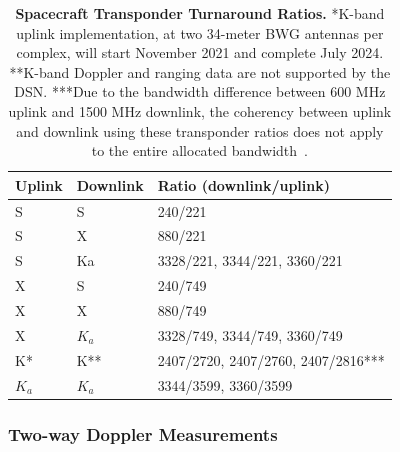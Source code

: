 \begin{table}[htp!]
\renewcommand{\arraystretch}{1.5}
\centering
\caption{
    \textbf{Spacecraft Transponder Turnaround Ratios.} *K-band uplink
    implementation, at two 34-meter BWG antennas per complex, will start
    November 2021 and complete July 2024. **K-band Doppler and ranging data are
    not supported by the DSN. ***Due to the bandwidth difference between 600 MHz
    uplink and 1500 MHz downlink, the coherency between uplink and downlink
    using these transponder ratios does not apply to the entire allocated
    bandwidth~\cite{Berner2020}.
}
\label{tab:turnaround-ratios}
\begin{tabular}{lll}
\hline
\textbf{Uplink} & \textbf{Downlink} & \textbf{Ratio (downlink/uplink)}  \\
\hline\hline
S               & S                 & 240/221                           \\
S               & X                 & 880/221                           \\
S               & Ka                & 3328/221, 3344/221, 3360/221      \\
X               & S                 & 240/749                           \\
X               & X                 & 880/749                           \\
X               & $K_a$             & 3328/749, 3344/749, 3360/749      \\
K*              & K**               & 2407/2720, 2407/2760, 2407/2816***\\
$K_a$           & $K_a$             & 3344/3599, 3360/3599              \\
\hline
\end{tabular}
\end{table}

\subsubsection{Two-way Doppler Measurements}

